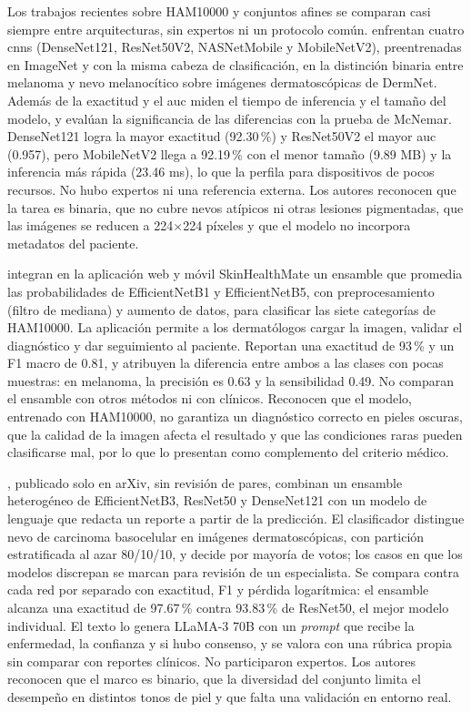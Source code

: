 Los trabajos recientes sobre HAM10000 y conjuntos afines se comparan casi siempre entre arquitecturas, sin expertos
ni un protocolo común. \textcite{kreouzi2024learning} enfrentan cuatro \glspl{cnn} (DenseNet121, ResNet50V2,
NASNetMobile y MobileNetV2), preentrenadas en ImageNet y con la misma cabeza de clasificación, en la distinción binaria
entre melanoma y nevo melanocítico sobre imágenes dermatoscópicas de DermNet. Además de la exactitud y el \gls{auc}
miden el tiempo de inferencia y el tamaño del modelo, y evalúan la significancia de las diferencias con la prueba de
McNemar. DenseNet121 logra la mayor exactitud (92.30\,\%) y ResNet50V2 el mayor \gls{auc} (0.957), pero MobileNetV2
llega a 92.19\,\% con el menor tamaño (9.89 MB) y la inferencia más rápida (23.46 ms), lo que la perfila para
dispositivos de pocos recursos. No hubo expertos ni una referencia externa. Los autores reconocen que la tarea es
binaria, que no cubre nevos atípicos ni otras lesiones pigmentadas, que las imágenes se reducen a 224$\times$224
píxeles y que el modelo no incorpora metadatos del paciente.

\textcite{aboulmira2024skinhealthmate} integran en la aplicación web y móvil SkinHealthMate un ensamble que promedia
las probabilidades de EfficientNetB1 y EfficientNetB5, con preprocesamiento (filtro de mediana) y aumento de datos,
para clasificar las siete categorías de HAM10000. La aplicación permite a los dermatólogos cargar la imagen, validar
el diagnóstico y dar seguimiento al paciente. Reportan una exactitud de 93\,\% y un F1 macro de 0.81, y atribuyen la
diferencia entre ambos a las clases con pocas muestras: en melanoma, la precisión es 0.63 y la sensibilidad 0.49. No
comparan el ensamble con otros métodos ni con clínicos. Reconocen que el modelo, entrenado con HAM10000, no garantiza
un diagnóstico correcto en pieles oscuras, que la calidad de la imagen afecta el resultado y que las condiciones
raras pueden clasificarse mal, por lo que lo presentan como complemento del criterio médico.

\textcite{khan2025ensemble}, publicado solo en arXiv, sin revisión de pares, combinan un ensamble heterogéneo de
EfficientNetB3, ResNet50 y DenseNet121 con un modelo de lenguaje que redacta un reporte a partir de la predicción. El
clasificador distingue nevo de carcinoma basocelular en imágenes dermatoscópicas, con partición estratificada al azar
80/10/10, y decide por mayoría de votos; los casos en que los modelos discrepan se marcan para revisión de un
especialista. Se compara contra cada red por separado con exactitud, F1 y pérdida logarítmica: el ensamble alcanza una
exactitud de 97.67\,\% contra 93.83\,\% de ResNet50, el mejor modelo individual. El texto lo genera LLaMA-3 70B con un
\emph{prompt} que recibe la enfermedad, la confianza y si hubo consenso, y se valora con una rúbrica propia sin
comparar con reportes clínicos. No participaron expertos. Los autores reconocen que el marco es binario, que la
diversidad del conjunto limita el desempeño en distintos tonos de piel y que falta una validación en entorno real.

